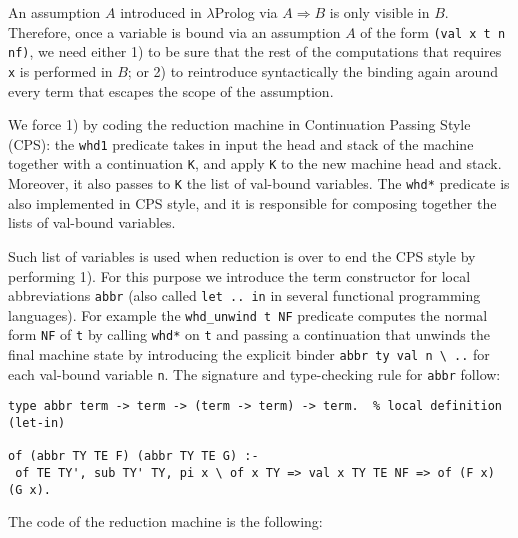 An assumption $A$ introduced in $\lambda$Prolog via $A \Rightarrow B$ is only visible in $B$. Therefore, once a variable is bound via an assumption $A$ of the form \verb+(val x t n nf)+, we need either 1) to be sure that the rest of the computations that requires \verb+x+ is performed in $B$; or 2) to reintroduce syntactically the binding again around every term that escapes the scope of the assumption.

We force 1) by coding the reduction machine in Continuation Passing Style (CPS): the \verb+whd1+ predicate takes in input the head and stack of the machine together with a continuation \verb+K+, and apply \verb+K+ to the new machine head and stack. Moreover, it also passes to \verb+K+ the list of val-bound variables.
The \verb+whd*+ predicate is also implemented in CPS style, and it is responsible for composing together the lists of val-bound variables.

Such list of variables is used when reduction is over to end the CPS style by performing 1).  For this purpose we introduce the term constructor for local abbreviations \verb+abbr+ (also called \verb+let .. in+ in several functional programming languages).  For example the \verb+whd_unwind t NF+ predicate computes the normal form \verb+NF+ of \verb+t+ by calling \verb+whd*+ on \verb+t+ and passing a continuation that unwinds the final machine state by introducing the explicit binder \verb+abbr ty val n \ ..+ for each val-bound variable \verb+n+.  The signature and type-checking rule for \verb+abbr+ follow:

\begin{Verbatim}
type abbr term -> term -> (term -> term) -> term.  % local definition (let-in)

of (abbr TY TE F) (abbr TY TE G) :-
 of TE TY', sub TY' TY, pi x \ of x TY => val x TY TE NF => of (F x) (G x).
\end{Verbatim}

The code of the reduction machine is the following:

